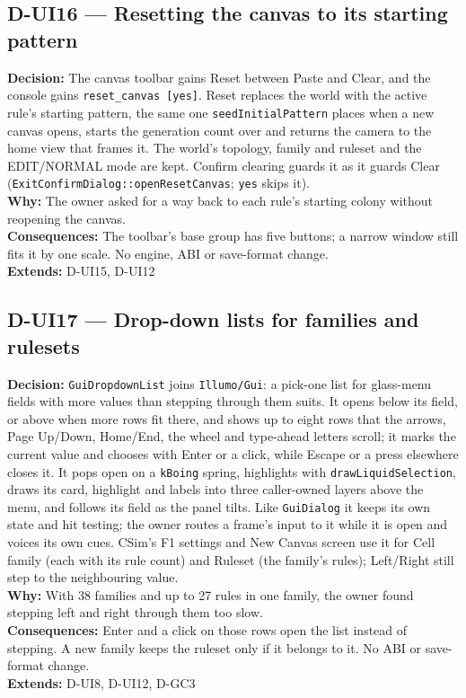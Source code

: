 \subsection*{D-UI16 --- Resetting the canvas to its starting pattern}
\begin{decisionbox}[title={D-UI16 \quad 2026-09-27}]
\textbf{Decision:} The canvas toolbar gains Reset between Paste and Clear,
and the console gains \texttt{reset\_canvas [yes]}. Reset replaces the world
with the active rule's starting pattern, the same one
\texttt{seedInitialPattern} places when a new canvas opens, starts the
generation count over and returns the camera to the home view that frames
it. The world's topology, family and ruleset and the EDIT/NORMAL mode are
kept. Confirm clearing guards it as it guards Clear
(\texttt{ExitConfirmDialog::openResetCanvas}; \texttt{yes} skips it).\\
\textbf{Why:} The owner asked for a way back to each rule's starting colony
without reopening the canvas.\\
\textbf{Consequences:} The toolbar's base group has five buttons; a narrow
window still fits it by one scale. No engine, ABI or save-format change.\\
\textbf{Extends:} D-UI15, D-UI12
\end{decisionbox}

\subsection*{D-UI17 --- Drop-down lists for families and rulesets}
\begin{decisionbox}[title={D-UI17 \quad 2026-09-27}]
\textbf{Decision:} \texttt{GuiDropdownList} joins \texttt{Illumo/Gui}: a
pick-one list for glass-menu fields with more values than stepping through
them suits. It opens below its field, or above when more rows fit there, and
shows up to eight rows that the arrows, Page Up/Down, Home/End, the wheel and
type-ahead letters scroll; it marks the current value and chooses with Enter
or a click, while Escape or a press elsewhere closes it. It pops open on a
\texttt{kBoing} spring, highlights with \texttt{drawLiquidSelection}, draws
its card, highlight and labels into three caller-owned layers above the menu,
and follows its field as the panel tilts. Like \texttt{GuiDialog} it keeps its
own state and hit testing; the owner routes a frame's input to it while it is
open and voices its own cues. CSim's F1 settings and New Canvas screen use it
for Cell family (each with its rule count) and Ruleset (the family's rules);
Left/Right still step to the neighbouring value.\\
\textbf{Why:} With 38 families and up to 27 rules in one family, the owner
found stepping left and right through them too slow.\\
\textbf{Consequences:} Enter and a click on those rows open the list instead
of stepping. A new family keeps the ruleset only if it belongs to it. No ABI
or save-format change.\\
\textbf{Extends:} D-UI8, D-UI12, D-GC3
\end{decisionbox}

